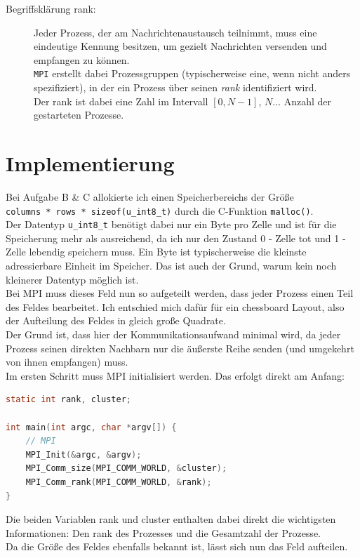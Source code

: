 \documentclass[german,plainarticle,hyperref,utf8]{zihpub}
\begin{document}
	\begin{description}
		\item[Begriffsklärung rank:] Jeder Prozess, der am Nachrichtenaustausch teilnimmt, muss eine eindeutige Kennung besitzen, um gezielt Nachrichten versenden und empfangen zu können.\\ \texttt{MPI} erstellt dabei Prozessgruppen (typischerweise eine, wenn nicht anders spezifiziert), in der ein Prozess über seinen \textit{rank} identifiziert wird.\\ Der rank ist dabei eine Zahl im Intervall $\left[0, N-1\right]$, $N\dotso$ Anzahl der gestarteten Prozesse.
		
	\end{description}
	\newpage
	\section{Implementierung}
	Bei Aufgabe B \& C allokierte ich einen Speicherbereichs der Größe\\ \texttt{columns * rows * sizeof(u\_int8\_t)} durch die C-Funktion \texttt{malloc()}.\\
	Der Datentyp \texttt{u\_int8\_t} benötigt dabei nur ein Byte pro Zelle und ist für die Speicherung mehr als ausreichend, da ich nur den Zustand 0 - Zelle tot und 1 - Zelle lebendig speichern muss. Ein Byte ist typischerweise die kleinste adressierbare Einheit im Speicher. Das ist auch der Grund, warum kein noch kleinerer Datentyp möglich ist.\\
	Bei MPI muss dieses Feld nun so aufgeteilt werden, dass jeder Prozess einen Teil des Feldes bearbeitet. Ich entschied mich dafür für ein chessboard Layout, also der Aufteilung des Feldes in gleich große Quadrate.\\
	Der Grund ist, dass hier der Kommunikationsaufwand minimal wird, da jeder Prozess seinen direkten Nachbarn nur die äußerste Reihe senden (und umgekehrt von ihnen empfangen) muss.\\
	Im ersten Schritt muss MPI initialisiert werden. Das erfolgt direkt am Anfang:
	\begin{lstlisting}[language=C, caption=MPI Initialisierung mit Bestimmung von rank und cluster]
static int rank, cluster;

int main(int argc, char *argv[]) {
	// MPI
	MPI_Init(&argc, &argv);
	MPI_Comm_size(MPI_COMM_WORLD, &cluster);
	MPI_Comm_rank(MPI_COMM_WORLD, &rank);
}\end{lstlisting}

	Die beiden Variablen rank und cluster enthalten dabei direkt die wichtigsten Informationen: Den rank des Prozesses und die Gesamtzahl der Prozesse.\\
	Da die Größe des Feldes ebenfalls bekannt ist, lässt sich nun das Feld aufteilen.\\
	
\end{document}
